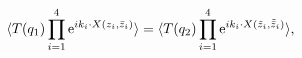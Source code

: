 \begin{equation}
\langle T(q_1) \prod_{i=1}^4 \hbox{e}^{i k_i \cdot X(z_i, \bar
z_i)} \rangle = \langle T(q_2) \prod_{i=1}^4 \hbox{e}^{i k_i \cdot
X(\tilde z_i, \tilde{\bar z}_i)} \rangle,
\end{equation}

